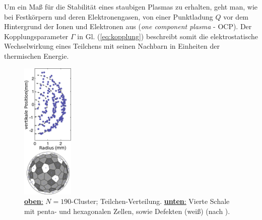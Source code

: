 \documentclass[numbers=noenddot,a4paper]{scrartcl}
\newcommand{\tilt}[1]{\textit{#1}}
\newcommand{\fett}[1]{\textbf{#1}}
\begin{document}
					Um ein Maß für die Stabilität eines staubigen Plasmas zu erhalten, geht man, wie bei Festkörpern und deren Elektronengasen, von einer Punktladung $Q$ vor dem Hintergrund der Ionen und Elektronen aus (\tilt{one component plasma} - OCP). Der Kopplungsparameter $\Gamma$ in Gl. (\ref{eq:kopplung}) beschreibt somit die elektrostatische Wechselwirkung eines Teilchens mit seinen Nachbarn in Einheiten der thermischen Energie.

						\begin{figure}
							\centering
							\vspace{-0.1cm}
							\includegraphics[width=0.22\textwidth,height=0.55\textwidth]{figs/yukawaballN190.png}
							\caption{\underline{\fett{oben}:} $N=190$-Cluster; Teilchen-Verteilung. \underline{\fett{unten}:} Vierte Schale mit penta- und hexagonalen Zellen, sowie Defekten (weiß) (nach \cite{Arp04}).}\label{img:strukturN190}
						\end{figure}
\end{document}
